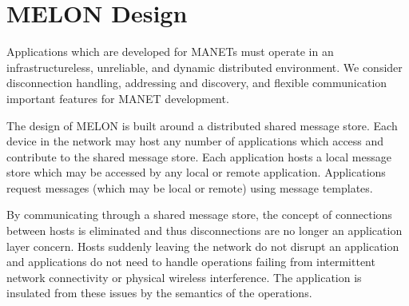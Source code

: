 \documentclass[lnicst]{svmultln}
\begin{document}



\section{MELON Design}\label{sec:design}

Applications which are developed for MANETs must operate in an infrastructureless, unreliable, and dynamic distributed environment. We consider disconnection handling, addressing and discovery, and flexible communication important features for MANET development.

The design of MELON is built around a distributed shared message store. Each device in the network may host any number of applications which access and contribute to the shared message store. Each application hosts a local message store which may be accessed by any local or remote application. Applications request messages (which may be local or remote) using message templates.

By communicating through a shared message store, the concept of connections between hosts is eliminated and thus disconnections are no longer an application layer concern. Hosts suddenly leaving the network do not disrupt an application and applications do not need to handle operations failing from intermittent network connectivity or physical wireless interference. The application is insulated from these issues by the semantics of the operations.
\end{document}
